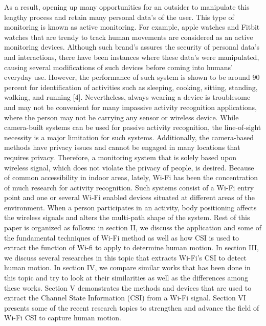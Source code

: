 \documentclass[conference]{IEEEtran}
\begin{document}
As a result, opening up many opportunities for an outsider to manipulate this lengthy process and retain many personal data’s of the user.  This type of monitoring is known as active monitoring. For example, apple watches and Fitbit watches that are trendy to track human movements are considered as an active monitoring devices. Although such brand’s assures the security of personal data’s and interactions, there have been instances where these data’s were manipulated, causing several modifications of such devices before coming into humans’ everyday use. However, the performance of such system is shown to be around 90 percent for identification of activities such as sleeping, cooking, sitting, standing, walking, and running [4]. \newline
Nevertheless, always wearing a device is troublesome and may not be convenient for many impassive activity recognition applications, where the person may not be carrying any sensor or wireless device. While camera-built systems can be used for passive activity recognition, the line-of-sight necessity is a major limitation for such systems. Additionally, the camera-based methods have privacy issues and cannot be engaged in many locations that requires privacy. Therefore, a monitoring system that is solely based upon wireless signal, which does not violate the privacy of people, is desired. Because of common accessibility in indoor areas, lately, Wi-Fi has been the concentration of much research for activity recognition. Such systems consist of a Wi-Fi entry point and one or several Wi-Fi enabled devices situated at different areas of the environment. When a person participates in an activity, body positioning affects the wireless signals and alters the multi-path shape of the system. 
\newline
Rest of this paper is organized as follows: in section II, we discuss the application and some of the fundamental techniques of Wi-Fi method as well as how  CSI is used to extract the function of Wi-fi to apply to  determine human motion. In section III, we discuss several researches in this topic that extracts Wi-Fi's CSI to detect human motion. In section IV, we compare similar works that has been done in this topic and try to look at their similarities as well as the differences among these works. Section V demonstrates the methods and devices that are used to extract the Channel State Information (CSI) from a Wi-Fi signal. Section VI presents some of the recent research topics to strengthen and advance the field of Wi-Fi CSI to capture human motion.
\end{document}

